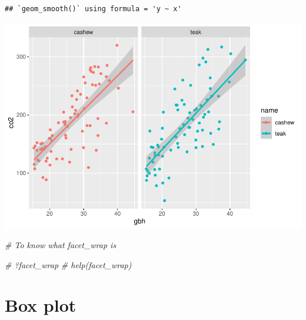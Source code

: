 \documentclass[
]{book}
\newenvironment{Shaded}{\begin{snugshade}}{\end{snugshade}}
\newcommand{\CommentTok}[1]{\textcolor[rgb]{0.56,0.35,0.01}{\textit{#1}}}
\begin{document}
\begin{verbatim}
## `geom_smooth()` using formula = 'y ~ x'
\end{verbatim}

\includegraphics{_main_files/figure-latex/unnamed-chunk-49-1.pdf}

\begin{Shaded}
\begin{Highlighting}[]
\CommentTok{\# To know what facet\_wrap is}

\CommentTok{\# ?facet\_wrap}
\CommentTok{\# help(facet\_wrap)}
\end{Highlighting}
\end{Shaded}

\hypertarget{box-plot}{%
\section{Box plot}\label{box-plot}}
\end{document}
